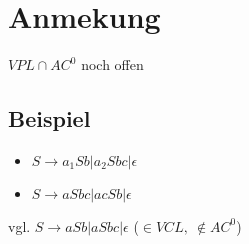 \section{Anmekung}
    $VPL\cap AC^0$ noch offen
    \subsection{Beispiel}
        \begin{itemize}
            \item $S\rightarrow a_1Sb|a_2Sbc|\epsilon$
            \item $S\rightarrow aSbc|acSb|\epsilon$
        \end{itemize}
        vgl. $S\rightarrow aSb|aSbc|\epsilon$ ($\in VCL,\ \not\in AC^0$)
